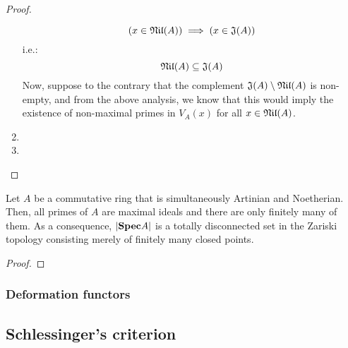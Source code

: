 \begin{proof}
\begin{enumerate}
                                $$\left(x \in \mathfrak{Nil}(A)\right) \implies \left(x \in \mathfrak{J}(A)\right)$$
                            i.e.:
                                $$\mathfrak{Nil}(A) \subseteq \mathfrak{J}(A)$$
                            Now, suppose to the contrary that the complement $\mathfrak{J}(A) \setminus \mathfrak{Nil}(A)$ is non-empty, and from the above analysis, we know that this would imply the existence of non-maximal primes in $V_A(x)$ for all $x \in \mathfrak{Nil}(A)$.  
                            \item
                            \item 
                        \end{enumerate}
                    \end{proof}
                \begin{corollary}
                    \cite[\href{https://stacks.math.columbia.edu/tag/00JB}{Tag 00JB}]{stacks} Let $A$ be a commutative ring that is simultaneously Artinian and Noetherian. Then, all primes of $A$ are maximal ideals and there are only finitely many of them. As a consequence, $|\mathbf{Spec} A|$ is a totally disconnected set in the Zariski topology consisting merely of finitely many closed points.
                \end{corollary}
                    \begin{proof}
                        
                    \end{proof}
                
                \begin{definition} \label{def: deformation_categories}
                     
                \end{definition}
                \begin{remark} \label{remark: why_local_artinian_rings}
                    
                \end{remark}
        
            \subsubsection{Deformation functors}
        
        \subsection{Schlessinger's criterion}
    
